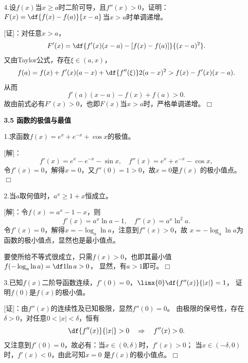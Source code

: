 4.设$f(x)$当$x\geq a$时二阶可导，且$f''(x)>0$，证明：
$F(x)=\df{f(x)-f(a)}{x-a}$当$x>a$时单调递增。

[证]：对任意$x>a$，
$$F'(x)=\df{f'(x)(x-a)-[f(x)-f(a)]}{(x-a)^2}.$$
又由Taylor公式，存在$\xi\in(a,x)$，
$$f(a)=f(x)+f'(x)(a-x)+\df{f''(\xi)}2(a-x)^2
>f(x)-f'(x)(x-a).$$
从而
$$f'(a)(x-a)-f(x)+f(a)>0.$$
故由前式必有$F'(x)>0$，也即$F(x)$当$x>a$时，严格单调递增。\hfill$\Box$

\begin{center}
	\bf 3.5 函数的极值与最值
\end{center}

\bigskip

1.求函数$f(x)=e^x+e^{-x}+\cos x$的极值。

[解]：
$$f'(x)=e^x-e^{-x}-\sin x,\quad f''(x)=e^x+e^{-x}-\cos x,$$
令$f'(x)=0$，解得$x=0$，又$f''(0)=1>0$，故$x=0$是$f(x)$
的极小值点。
\hfill$\Box$

\bigskip

2.当$a$取何值时，$a^x\geq1+x$恒成立。

[解]：令$f(x)=a^x-1-x$，则
$$f'(x)=a^x\ln a-1,\quad f''(x)=a^x\ln^2a.$$
令$f'(x)=0$，解得$x=-\log_a\ln a$，注意到$f''(x)>0$，故
$x=-\log_a\ln a$为函数的极小值点，显然也是最小值点。

要使所给不等式很成立，只需$f(x)>0$，也即其最小值
$f(-\log_a\ln a)=\df1{\ln a}>0$，
显然，有$a>1$即可。\hfill$\Box$

\bigskip

3.已知$f(x)$二阶导函数连续，$f'(0)=0$，$\limx{0}\df{f''(x)}{|x|}=1$，
证明$f(0)$是$f(x)$的极小值。

[证]：由$f''(x)$的连续性及已知极限，显然$f''(0)=0$。
由极限的保号性，存在$\delta>0$，对任意$0<|x|<\delta$，恒有
$$\df{f''(x)}{|x|}>0\quad
\Rightarrow\quad f''(x)>0.$$
又注意到$f'(0)=0$，故必有：当$x\in(0,\delta)$时，$f'(x)>0$；
当$x\in(-\delta,0)$时，$f'(x)<0$，由此可知$x=0$
是$f(x)$的极小值点。\hfill$\Box$

\bigskip



